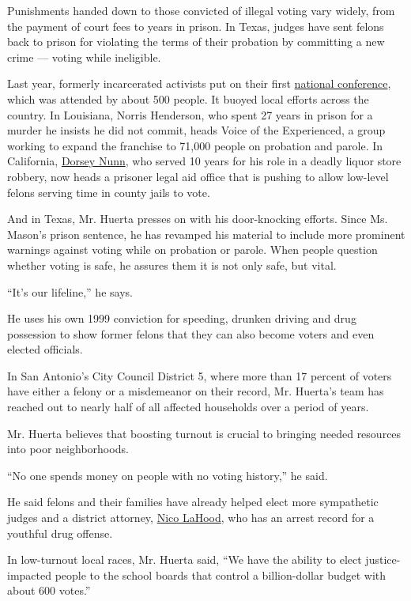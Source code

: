 Punishments handed down to those convicted of illegal voting vary
widely, from the payment of court fees to years in prison. In Texas,
judges have sent felons back to prison for violating the terms of their
probation by committing a new crime --- voting while ineligible.

Last year, formerly incarcerated activists put on their first
\href{https://ficpmovement.wordpress.com/2016-ficpfm-national-conference/}{national
conference}, which was attended by about 500 people. It buoyed local
efforts across the country. In Louisiana, Norris Henderson, who spent 27
years in prison for a murder he insists he did not commit, heads Voice
of the Experienced, a group working to expand the franchise to 71,000
people on probation and parole. In California,
\href{http://www.prisonerswithchildren.org/about/staff-directory/dorsey-nunn/}{Dorsey
Nunn}, who served 10 years for his role in a deadly liquor store
robbery, now heads a prisoner legal aid office that is pushing to allow
low-level felons serving time in county jails to vote.

And in Texas, Mr. Huerta presses on with his door-knocking efforts.
Since Ms. Mason's prison sentence, he has revamped his material to
include more prominent warnings against voting while on probation or
parole. When people question whether voting is safe, he assures them it
is not only safe, but vital.

``It's our lifeline,'' he says.

He uses his own 1999 conviction for speeding, drunken driving and drug
possession to show former felons that they can also become voters and
even elected officials.

In San Antonio's City Council District 5, where more than 17 percent of
voters have either a felony or a misdemeanor on their record, Mr.
Huerta's team has reached out to nearly half of all affected households
over a period of years.

Mr. Huerta believes that boosting turnout is crucial to bringing needed
resources into poor neighborhoods.

``No one spends money on people with no voting history,'' he said.

He said felons and their families have already helped elect more
sympathetic judges and a district attorney,
\href{https://www.mysanantonio.com/news/article/Unlawful-past-may-hurt-district-attorney-bid-789407.php}{Nico
LaHood}, who has an arrest record for a youthful drug offense.

In low-turnout local races, Mr. Huerta said, ``We have the ability to
elect justice-impacted people to the school boards that control a
billion-dollar budget with about 600 votes.''

